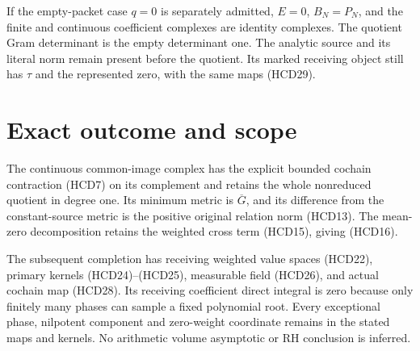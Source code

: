If the empty-packet case $q=0$ is separately admitted,
$E=0$, $B_N=P_N$, and the finite and continuous coefficient
complexes are identity complexes. The quotient Gram
determinant is the empty determinant one. The analytic
source and its literal norm remain present before the
quotient. Its marked receiving object still has $\tau$
and the represented zero, with the same maps (HCD29).

\section{Exact outcome and scope}

The continuous common-image complex has the explicit bounded
cochain contraction (HCD7) on its complement and retains
the whole nonreduced quotient in degree one.
Its minimum metric is $\overline G$, and its difference
from the constant-source metric is the positive original
relation norm (HCD13). The mean-zero decomposition retains
the weighted cross term (HCD15), giving (HCD16).

The subsequent completion has receiving weighted value
spaces (HCD22), primary kernels (HCD24)--(HCD25), measurable
field (HCD26), and actual cochain map (HCD28).
Its receiving coefficient direct integral is zero because
only finitely many phases can sample a fixed polynomial root.
Every exceptional phase, nilpotent component and zero-weight
coordinate remains in the stated maps and kernels.
No arithmetic volume asymptotic or RH conclusion is inferred.

